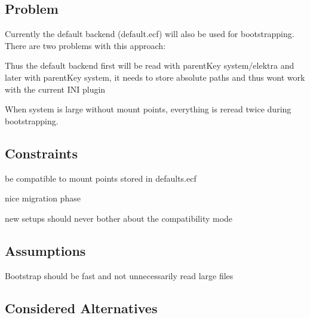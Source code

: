 \subsection*{Problem}

Currently the default backend (default.\+ecf) will also be used for bootstrapping. There are two problems with this approach\+:


\begin{DoxyEnumerate}
\item Thus the default backend first will be read with parent\+Key {\ttfamily system/elektra} and later with parent\+Key {\ttfamily system}, it needs to store absolute paths and thus won\textquotesingle{}t work with the current I\+NI plugin
\item When {\ttfamily system} is large without mount points, everything is reread twice during bootstrapping.
\end{DoxyEnumerate}

\subsection*{Constraints}


\begin{DoxyItemize}
\item be compatible to mount points stored in {\ttfamily defaults.\+ecf}
\item nice migration phase
\item new setups should never bother about the compatibility mode
\end{DoxyItemize}

\subsection*{Assumptions}


\begin{DoxyItemize}
\item Bootstrap should be fast and not unnecessarily read large files
\end{DoxyItemize}

\subsection*{Considered Alternatives}


